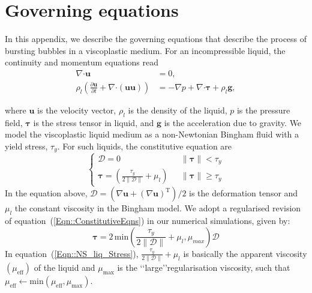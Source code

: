 \documentclass[final]{jfm}
\begin{document}
\section{Governing equations}\label{App::GoverningEquations}
In this appendix, we describe the governing equations that describe the process of bursting bubbles in a viscoplastic medium. For an incompressible liquid, the continuity and momentum equations read  
\begin{align}\label{Eqn::NS_liq}
\nabla\boldsymbol{\cdot}\boldsymbol{u} &= 0,\\ 
\label{Eqn::NS_liq2}
\rho_l\left(\frac{\partial\boldsymbol{u}}{\partial t} + \nabla\boldsymbol{\cdot}\left(\boldsymbol{uu}\right)\right) &= -\nabla p + \nabla\boldsymbol{\cdot}\boldsymbol{\tau} + \rho_l\boldsymbol{g},
\end{align}

\noindent where $\boldsymbol{u}$ is the velocity vector, $\rho_l$ is the density of the liquid, $p$ is the pressure field, $\boldsymbol{\tau}$ is the stress tensor in liquid, and $\boldsymbol{g}$ is the acceleration due to gravity.
We model the viscoplastic liquid medium as a non-Newtonian Bingham fluid with a yield stress, $\tau_y$. For such liquids, the constitutive equation are
\begin{equation}\label{Eqn::ConstitutiveEqns}
\begin{cases}
\boldsymbol{\mathcal{D}}=0\,\,&\,\,\|\boldsymbol{\tau}\| < \tau_y\\
\boldsymbol{\tau} =\left( \frac{\tau_y}{2 \|\boldsymbol{\mathcal{D}} \|} + \mu_l \right)\,\,&\,\,\|\boldsymbol{\tau}\| \geq \tau_y
\end{cases}
\end{equation} 
In the equation above, $\boldsymbol{\mathcal{D}} = \left(\nabla\boldsymbol{u} + \left(\nabla\boldsymbol{u}\right)^{\text{T}}\right)/2$ is the deformation tensor and $\mu_l$ the constant viscosity in the Bingham model. 
We adopt a regularised revision of equation~(\ref{Eqn::ConstitutiveEqns}) in our numerical simulations, given by:
\begin{equation}\label{Eqn::NS_liq_Stress}
\boldsymbol{\tau} = 2\,\mathrm{min}\left(\frac{\tau_y}{2\|\boldsymbol{\mathcal{D}}\|} + \mu_l , \mu_{max}\right) \boldsymbol{\mathcal{D}}
\end{equation}
In equation~(\ref{Eqn::NS_liq_Stress}), $\frac{\tau_y}{2\|\boldsymbol{\mathcal{D}}\|} + \mu_l$ is basically the apparent viscosity $\left(\mu_{\text{eff}}\right)$ of the liquid and $\mu_{\text{max}}$ is the \lq\lq large\rq\rq regularisation viscosity, such that $\mu_{\text{eff}} \gets \text{min}\left(\mu_{\text{eff}}, \mu_{\text{max}}\right)$. 
\end{document}
